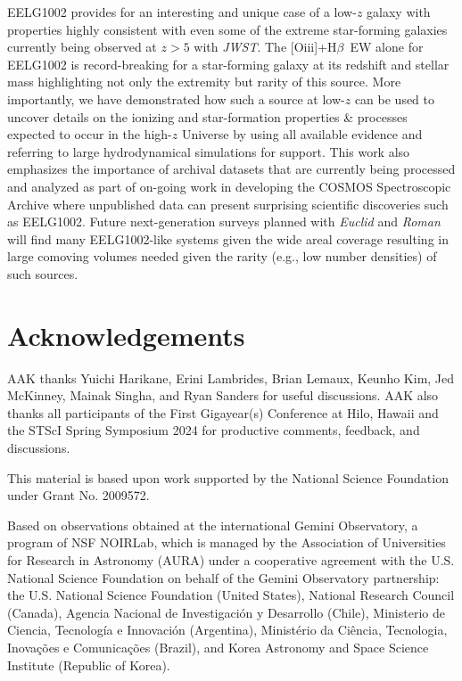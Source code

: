 \documentclass[twocolumn,tight,times,linenumbers]{aastex631}
\newcommand{\hbeta}{H$\beta$}
\newcommand{\oiii}{[O{\sc iii}]}
\begin{document}
		EELG1002 provides for an interesting and unique case of a low-$z$ galaxy with properties highly consistent with even some of the extreme star-forming galaxies currently being observed at $z > 5$ with \textit{JWST}. The \oiii+\hbeta~EW alone for EELG1002 is record-breaking for a star-forming galaxy at its redshift and stellar mass highlighting not only the extremity but rarity of this source. More importantly, we have demonstrated how such a source at low-$z$ can be used to uncover details on the ionizing and star-formation properties \& processes expected to occur in the high-$z$ Universe by using all available evidence and referring to large hydrodynamical simulations for support. This work also emphasizes the importance of archival datasets that are currently being processed and analyzed as part of on-going work in developing the COSMOS Spectroscopic Archive where unpublished data can present surprising scientific discoveries such as EELG1002. Future next-generation surveys planned with \textit{Euclid} and \textit{Roman} will find many EELG1002-like systems given the wide areal coverage resulting in large comoving volumes needed given the rarity (e.g., low number densities) of such sources.
		
		
		
		\section*{Acknowledgements}
		
		AAK thanks Yuichi Harikane, Erini Lambrides, Brian Lemaux, Keunho Kim, Jed McKinney, Mainak Singha, and Ryan Sanders for useful discussions. AAK also thanks all participants of the First Gigayear(s) Conference at Hilo, Hawaii and the STScI Spring Symposium 2024 for productive comments, feedback, and discussions. %

        This material is based upon work supported by the National Science Foundation under Grant No. 2009572.
		
		Based on observations obtained at the international Gemini Observatory, a program of NSF NOIRLab, which is managed by the Association of Universities for Research in Astronomy (AURA) under a cooperative agreement with the U.S. National Science Foundation on behalf of the Gemini Observatory partnership: the U.S. National Science Foundation (United States), National Research Council (Canada), Agencia Nacional de Investigaci\'{o}n y Desarrollo (Chile), Ministerio de Ciencia, Tecnolog\'{i}a e Innovaci\'{o}n (Argentina), Minist\'{e}rio da Ci\^{e}ncia, Tecnologia, Inova\c{c}\~{o}es e Comunica\c{c}\~{o}es (Brazil), and Korea Astronomy and Space Science Institute (Republic of Korea).
		
\end{document}
